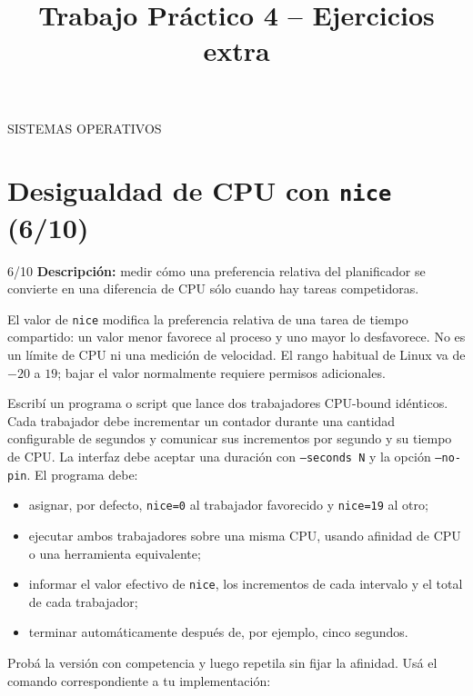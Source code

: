 \documentclass[11pt,a4paper]{article}
\title{Trabajo Práctico 4 -- Ejercicios extra}
\author{}
\date{}
\begin{document}
\renewcommand{\contentsname}{Tracks}
\maketitle
\thispagestyle{fancy}
\begin{center}
SISTEMAS OPERATIVOS
\end{center}
\newpage

\tableofcontents
\newpage

\section{Desigualdad de CPU con \texttt{nice} (6/10)}

\begin{trackbox}{6/10}
\textbf{Descripción:} medir cómo una preferencia relativa del planificador se
convierte en una diferencia de CPU sólo cuando hay tareas competidoras.
\end{trackbox}

El valor de \texttt{nice} modifica la preferencia relativa de una tarea de
tiempo compartido: un valor menor favorece al proceso y uno mayor lo
desfavorece. No es un límite de CPU ni una medición de velocidad. El rango
habitual de Linux va de $-20$ a $19$; bajar el valor normalmente requiere
permisos adicionales.

Escribí un programa o script que lance dos trabajadores CPU-bound idénticos.
Cada trabajador debe incrementar un contador durante una cantidad configurable
de segundos y comunicar sus incrementos por segundo y su tiempo de CPU. La
interfaz debe aceptar una duración con \texttt{--seconds N} y la opción
\texttt{--no-pin}. El programa debe:

\begin{itemize}[leftmargin=*]
  \item asignar, por defecto, \texttt{nice=0} al trabajador favorecido y
  \texttt{nice=19} al otro;
  \item ejecutar ambos trabajadores sobre una misma CPU, usando afinidad de
  CPU o una herramienta equivalente;
  \item informar el valor efectivo de \texttt{nice}, los incrementos de cada
  intervalo y el total de cada trabajador;
  \item terminar automáticamente después de, por ejemplo, cinco segundos.
\end{itemize}

Probá la versión con competencia y luego repetila sin fijar la afinidad. Usá
el comando correspondiente a tu implementación:
\end{document}
